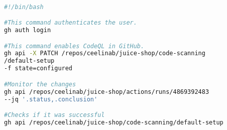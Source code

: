 \newpage
\label{EnableCodeQL}
\begin{lstlisting}[language=bash, caption=Enable CodeQL, captionpos=b, frame=single]

#!/bin/bash

#This command authenticates the user.
gh auth login

#This command enables CodeQL in GitHub. 
gh api -X PATCH /repos/ceelinab/juice-shop/code-scanning
/default-setup
-f state=configured

#Monitor the changes
gh api /repos/ceelinab/juice-shop/actions/runs/4869392483 
--jq '.status,.conclusion'

#Checks if it was successful
gh api /repos/ceelinab/juice-shop/code-scanning/default-setup

\end{lstlisting}
\